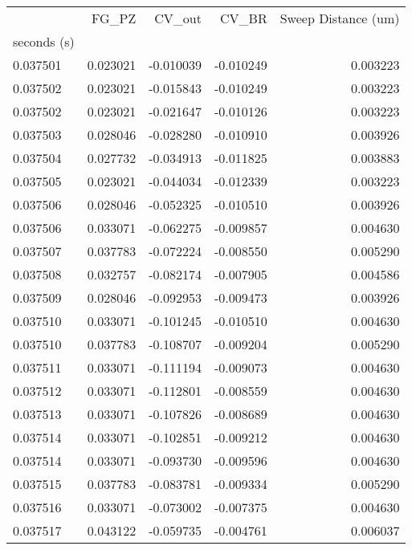 \begin{tabular}{lrrrr}
\toprule
{} &     FG\_PZ &    CV\_out &     CV\_BR &  Sweep Distance (um) \\
seconds (s) &           &           &           &                      \\
\midrule
0.037501    &  0.023021 & -0.010039 & -0.010249 &             0.003223 \\
0.037502    &  0.023021 & -0.015843 & -0.010249 &             0.003223 \\
0.037502    &  0.023021 & -0.021647 & -0.010126 &             0.003223 \\
0.037503    &  0.028046 & -0.028280 & -0.010910 &             0.003926 \\
0.037504    &  0.027732 & -0.034913 & -0.011825 &             0.003883 \\
0.037505    &  0.023021 & -0.044034 & -0.012339 &             0.003223 \\
0.037506    &  0.028046 & -0.052325 & -0.010510 &             0.003926 \\
0.037506    &  0.033071 & -0.062275 & -0.009857 &             0.004630 \\
0.037507    &  0.037783 & -0.072224 & -0.008550 &             0.005290 \\
0.037508    &  0.032757 & -0.082174 & -0.007905 &             0.004586 \\
0.037509    &  0.028046 & -0.092953 & -0.009473 &             0.003926 \\
0.037510    &  0.033071 & -0.101245 & -0.010510 &             0.004630 \\
0.037510    &  0.037783 & -0.108707 & -0.009204 &             0.005290 \\
0.037511    &  0.033071 & -0.111194 & -0.009073 &             0.004630 \\
0.037512    &  0.033071 & -0.112801 & -0.008559 &             0.004630 \\
0.037513    &  0.033071 & -0.107826 & -0.008689 &             0.004630 \\
0.037514    &  0.033071 & -0.102851 & -0.009212 &             0.004630 \\
0.037514    &  0.033071 & -0.093730 & -0.009596 &             0.004630 \\
0.037515    &  0.037783 & -0.083781 & -0.009334 &             0.005290 \\
0.037516    &  0.033071 & -0.073002 & -0.007375 &             0.004630 \\
0.037517    &  0.043122 & -0.059735 & -0.004761 &             0.006037 \\

\end{tabular}

